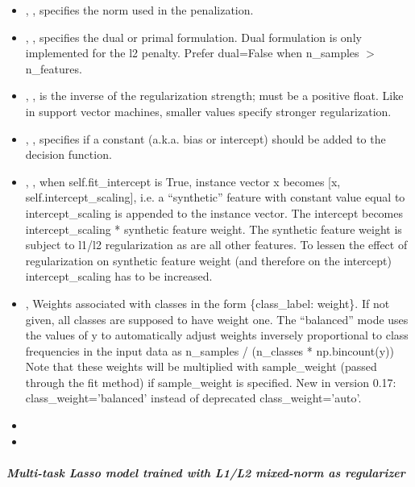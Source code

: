 \begin{itemize}
  \item {}, , specifies the norm
  used in the penalization.
  \item {}, , specifies the dual or primal
  formulation.
  Dual formulation is only implemented for the l2 penalty.
  Prefer dual=False when n\_samples $>$ n\_features.
  \item {}, , is the inverse of the
  regularization strength; must be a positive float.
  Like in support vector machines, smaller values specify stronger
  regularization.
  \item {}, , specifies if a constant
  (a.k.a. bias or intercept) should be added to the decision function.
  \item {}, , when
  self.fit\_intercept is True, instance vector x becomes [x,
  self.intercept\_scaling], i.e. a ``synthetic'' feature with constant value
  equal to intercept\_scaling is appended to the instance vector.
  The intercept becomes intercept\_scaling * synthetic feature
  weight.
  \nb The synthetic feature weight is subject to l1/l2 regularization as are all
  other features.
  To lessen the effect of regularization on synthetic feature weight (and
  therefore on the intercept) intercept\_scaling has to be increased.
  \item {}, 
  Weights associated with classes in the form \{class\_label: weight\}. If not given, all classes are supposed to have weight one.
  The ``balanced'' mode uses the values of y to automatically adjust weights inversely proportional to class frequencies in the
  input data as n\_samples / (n\_classes * np.bincount(y))
  Note that these weights will be multiplied with sample\_weight (passed through the fit method) if sample\_weight is specified.
  New in version 0.17: class\_weight=’balanced’ instead of deprecated class\_weight=’auto’.
  \item {}
  \item {}
\end{itemize}
\subparagraph{Multi-task Lasso model trained with L1/L2 mixed-norm as
  regularizer}
